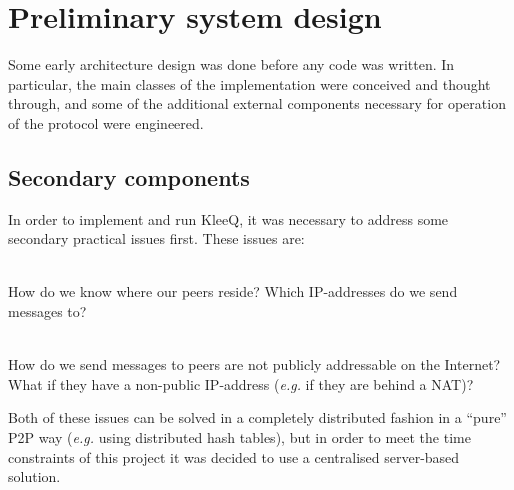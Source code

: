 \documentclass[a4paper, twoside, 12pt]{report}
\begin{document}
\section{Preliminary system design}
\label{sec:prep.design}
Some early architecture design was done before any code was written. In particular, the main classes of the implementation were conceived and thought through, and some of the additional external components necessary for operation of the protocol were engineered.
\subsection{Secondary components}
In order to implement and run KleeQ, it was necessary to address some secondary practical issues first. These issues are:
\begin{description}[labelindent=0.5cm, leftmargin=1.3cm, rightmargin=0.5cm]
    \item[Contact Discovery] \hfill \\
        How do we know where our peers reside? Which IP-addresses do we send messages to?
    \item[Transport] \hfill \\
        How do we send messages to peers are not publicly addressable on the Internet? What if they have a non-public IP-address (\textit{e.g.} if they are behind a NAT)?
\end{description}

Both of these issues can be solved in a completely distributed fashion in a ``pure'' P2P way (\textit{e.g.} using distributed hash tables), but in order to meet the time constraints of this project it was decided to use a centralised server-based solution. \\
\end{document}

